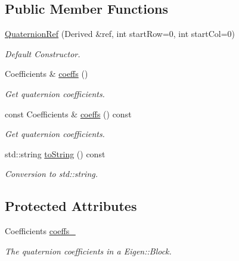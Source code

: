 \subsection*{Public Member Functions}
\begin{DoxyCompactItemize}
\item 
\hyperlink{classEigen_1_1QuaternionRef_a248478189cea730141b0a3b9d9dd9a63}{Quaternion\+Ref} (Derived \&ref, int start\+Row=0, int start\+Col=0)
\begin{DoxyCompactList}\small\item\em Default Constructor. \end{DoxyCompactList}\item 
Coefficients \& \hyperlink{classEigen_1_1QuaternionRef_ad181c3d0f58e30e4508c10f7c6bc8c73}{coeffs} ()
\begin{DoxyCompactList}\small\item\em Get quaternion coefficients. \end{DoxyCompactList}\item 
const Coefficients \& \hyperlink{classEigen_1_1QuaternionRef_a32775ef17d906112484443a31307052f}{coeffs} () const 
\begin{DoxyCompactList}\small\item\em Get quaternion coefficients. \end{DoxyCompactList}\item 
std\+::string \hyperlink{classEigen_1_1QuaternionRef_a29a95c2bb2683a0720d7b0e55a79ef56}{to\+String} () const \hypertarget{classEigen_1_1QuaternionRef_a29a95c2bb2683a0720d7b0e55a79ef56}{}\label{classEigen_1_1QuaternionRef_a29a95c2bb2683a0720d7b0e55a79ef56}

\begin{DoxyCompactList}\small\item\em Conversion to std\+::string. \end{DoxyCompactList}\end{DoxyCompactItemize}
\subsection*{Protected Attributes}
\begin{DoxyCompactItemize}
\item 
Coefficients \hyperlink{classEigen_1_1QuaternionRef_a236621f8f2822fc2c9ef50069badf64f}{coeffs\+\_\+}\hypertarget{classEigen_1_1QuaternionRef_a236621f8f2822fc2c9ef50069badf64f}{}\label{classEigen_1_1QuaternionRef_a236621f8f2822fc2c9ef50069badf64f}

\begin{DoxyCompactList}\small\item\em The quaternion coefficients in a Eigen\+::\+Block. \end{DoxyCompactList}\end{DoxyCompactItemize}



